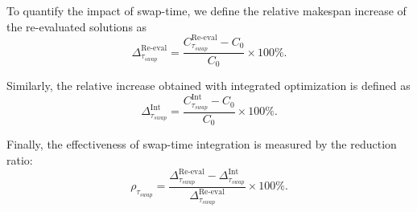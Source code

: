 \documentclass[3p, authoryear, 11pt]{elsarticle}
\begin{document}
To quantify the impact of swap-time, we define the relative makespan increase of the re-evaluated solutions as
\begin{equation}
\Delta^{\mathrm{Re\text{-}eval}}_{\tau_{swap}}
=
\frac{C^{\mathrm{Re\text{-}eval}}_{\tau_{swap}} - C_0}{C_0} \times 100\%.
\end{equation}

Similarly, the relative increase obtained with integrated optimization is defined as
\begin{equation}
\Delta^{\mathrm{Int}}_{\tau_{swap}}
=
\frac{C^{\mathrm{Int}}_{\tau_{swap}} - C_0}{C_0} \times 100\%.
\end{equation}

Finally, the effectiveness of swap-time integration is measured by the reduction ratio:
\begin{equation}
\rho_{\tau_{swap}}
=
\frac{
\Delta^{\mathrm{Re\text{-}eval}}_{\tau_{swap}} - \Delta^{\mathrm{Int}}_{\tau_{swap}}
}{
\Delta^{\mathrm{Re\text{-}eval}}_{\tau_{swap}}
}
\times 100\%.
\end{equation}
\end{document}
